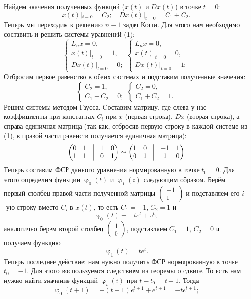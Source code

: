 \documentclass[a4paper, 12pt]{article}
\renewcommand{\varphi}{\upvarphi}
\begin{document}
Найдем значения полученных функций ($x(t)$ и $Dx(t)$) в точке $t = 0$: $$x(t)|_{t=0} = C_2;\quad Dx(t)|_{t=0} = C_1 + C_2.$$
Теперь мы переходим к решению $n-1$ задач Коши. Для этого нам необходимо составить и решить системы уравнений (1):
$$\begin{cases}
	L_nx = 0,\\
	x(t)|_{t=0} = 1,\\
	Dx(t)|_{t=0} = 0;
\end{cases} \begin{cases}
L_nx = 0,\\
x(t)|_{t=0} = 0,\\
Dx(t)|_{t=0} = 1;
\end{cases}$$ Отбросим первое равенство в обеих системах и подставим полученные значения:
$$\begin{cases}
	C_2 = 1,\\
	C_1 + C_2 = 0;
\end{cases}\begin{cases}
C_2 = 0,\\
C_1 + C_2 = 1.
\end{cases}$$ Решим системы методом Гаусса. Cоставим матрицу, где слева у нас коэффициенты при константах $C_i$ при $x$ (первая строка), $Dx$ (вторая строка), а справа единичная матрица (так как, отбросив первую строку в каждой системе из (1), в правой части равенств получается единичная матрица):
$$\begin{pmatrix}
	0 & 1 & \vline & 1 & 0\\
	1 & 1 & \vline & 0 & 1
\end{pmatrix}\sim \begin{pmatrix}
	1 & 0 & \vline & -1 & 1\\
	0 & 1 & \vline & 1 & 0
\end{pmatrix}$$
Теперь составим ФСР данного уравнения нормированную в точке $t_0 = 0$. Для этого определим функции $\varphi_0(t)$ и $\varphi_1(t)$ следующим образом. Берём первый столбец правой части полученной матрицы $\begin{pmatrix}
	-1\\1
\end{pmatrix}$ и подставляем его $i$-ую строку вместо $C_i$ в $x(t)$, то есть $C_1 = -1$, $C_2 = 1$ и $$\varphi_0(t) = -te^t + e^t;$$
аналогично берем второй столбец $\begin{pmatrix}
	1\\0
\end{pmatrix}$, подставляем $C_1 = 1$, $C_2 = 0$ и получаем функцию
$$\varphi_1(t) = te^t.$$
Теперь последнее действие: нам нужно получить ФСР нормированную в точке $t_0 = -1$. Для этого воспользуемся следствием из теоремы о сдвиге. То есть нам нужно найти значение функций $\varphi_i(t)$ при $t - t_0 = t + 1$. Тогда $$\varphi_0(t+1) = -(t+1)e^{t+1} + e^{t+1} = -te^{t+1};$$
\end{document}
